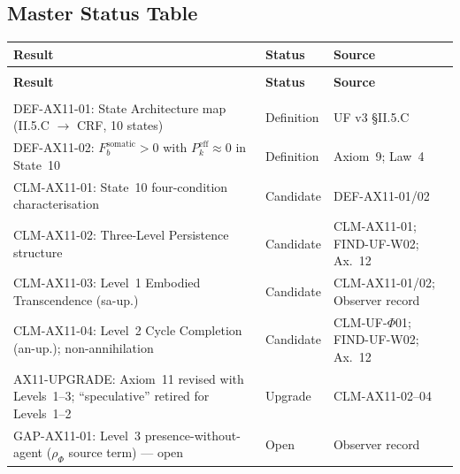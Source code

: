 \documentclass[12pt, a4paper]{article}
\providecommand{\Fbsom}{F_b^{\mathrm{somatic}}}
\providecommand{\Pkeff}{P_k^{\mathrm{eff}}}
\begin{document}
\subsection{Master Status Table}


{\small
\setlength{\LTpre}{4pt}\setlength{\LTpost}{4pt}
\renewcommand{\arraystretch}{1.30}
\begin{longtable}{>{\raggedright\arraybackslash}p{5.8cm}
                  >{\centering\arraybackslash}p{2.5cm}
                  >{\raggedright\arraybackslash}p{4.0cm}}
\toprule
\textbf{Result} & \textbf{Status} & \textbf{Source} \\
\midrule
\endfirsthead
\multicolumn{3}{l}{\small\textit{(continued)}}\\[4pt]
\toprule
\textbf{Result} & \textbf{Status} & \textbf{Source} \\
\midrule
\endhead
\midrule
\multicolumn{3}{r}{\small\textit{(continues)}}\\
\endfoot
\bottomrule
\endlastfoot

DEF-AX11-01: State Architecture map
  (II.5.C $\to$ CRF, 10 states) &
  Definition & UF v3 \S II.5.C \\

DEF-AX11-02: $\Fbsom > 0$ with
  $\Pkeff \approx 0$ in State~10 &
  Definition & Axiom~9; Law~4 \\

CLM-AX11-01: State~10 four-condition
  characterisation &
  Candidate & DEF-AX11-01/02 \\

CLM-AX11-02: Three-Level Persistence
  structure &
  Candidate & CLM-AX11-01;
  FIND-UF-W02; Ax.~12 \\

CLM-AX11-03: Level~1 Embodied
  Transcendence (sa-up.) &
  Candidate & CLM-AX11-01/02;
  Observer record \\

CLM-AX11-04: Level~2 Cycle Completion
  (an-up.); non-annihilation &
  Candidate & CLM-UF-$\Phi$01;
  FIND-UF-W02; Ax.~12 \\

AX11-UPGRADE: Axiom~11 revised with
  Levels~1--3; ``speculative'' retired
  for Levels~1--2 &
  Upgrade & CLM-AX11-02--04 \\

GAP-AX11-01: Level~3 presence-without-
  agent ($\rho_\Phi$ source term) ---
  open &
  Open & Observer record \\

\end{longtable}
}
\vspace{-\parskip}
\end{document}

